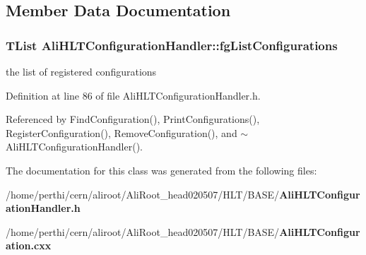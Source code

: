 \subsection{Member Data Documentation}
\subsubsection{\setlength{\rightskip}{0pt plus 5cm}TList {\bf Ali\-HLTConfiguration\-Handler::fg\-List\-Configurations}\hspace{0.3cm}{\tt  [private]}}\label{classAliHLTConfigurationHandler_r0}


the list of registered configurations 

Definition at line 86 of file Ali\-HLTConfiguration\-Handler.h.

Referenced by Find\-Configuration(), Print\-Configurations(), Register\-Configuration(), Remove\-Configuration(), and $\sim$Ali\-HLTConfiguration\-Handler().

The documentation for this class was generated from the following files:\begin{CompactItemize}
\item 
/home/perthi/cern/aliroot/Ali\-Root\_\-head020507/HLT/BASE/{\bf Ali\-HLTConfiguration\-Handler.h}\item 
/home/perthi/cern/aliroot/Ali\-Root\_\-head020507/HLT/BASE/{\bf Ali\-HLTConfiguration.cxx}\end{CompactItemize}
